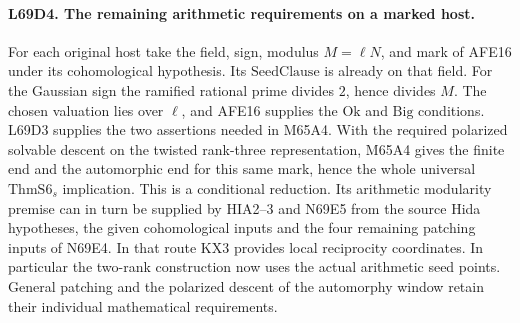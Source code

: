 \paragraph{L69D4. The remaining arithmetic requirements on a marked host.}
For each original host take the field, sign, modulus $M=\ell N$,
and mark of AFE16 under its cohomological hypothesis. Its
$\mathrm{SeedClause}$ is already on that field. For the Gaussian
sign the ramified rational prime divides $2$, hence divides $M$.
The chosen valuation lies over $\ell$, and AFE16 supplies the
$\mathrm{Ok}$ and $\mathrm{Big}$ conditions. L69D3 supplies the
two assertions needed in M65A4. With the required polarized
solvable descent on the twisted rank-three representation, M65A4
gives the finite end and the automorphic end for this same mark,
hence the whole universal $\mathrm{ThmS6}_s$ implication. This is
a conditional reduction. Its arithmetic modularity premise can in
turn be supplied by HIA2--3 and N69E5 from the source Hida
hypotheses, the given cohomological inputs and the four remaining
patching inputs of N69E4. In that route KX3 provides local
reciprocity coordinates. In particular the two-rank construction
now uses the actual arithmetic seed points. General patching and
the polarized descent of the automorphy window retain their
individual mathematical requirements.
